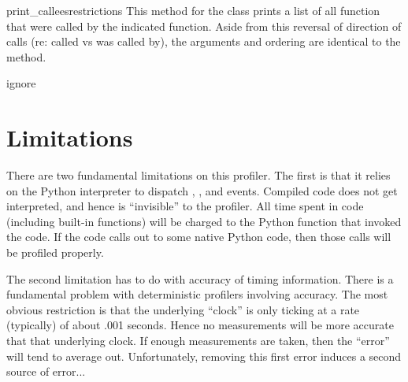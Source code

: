 \begin{methoddesc}[Stats]{print_callees}{restrictions}
This method for the  class prints a list of all function
that were called by the indicated function.  Aside from this reversal
of direction of calls (re: called vs was called by), the arguments and
ordering are identical to the  method.
\end{methoddesc}

\begin{methoddesc}[Stats]{ignore}{}
\end{methoddesc}


\section{Limitations \label{profile-limits}}

There are two fundamental limitations on this profiler.  The first is
that it relies on the Python interpreter to dispatch ,
, and  events.  Compiled \C{} code does not
get interpreted, and hence is ``invisible'' to the profiler.  All time
spent in \C{} code (including built-in functions) will be charged to the
Python function that invoked the \C{} code.  If the \C{} code calls out
to some native Python code, then those calls will be profiled
properly.

The second limitation has to do with accuracy of timing information.
There is a fundamental problem with deterministic profilers involving
accuracy.  The most obvious restriction is that the underlying ``clock''
is only ticking at a rate (typically) of about .001 seconds.  Hence no
measurements will be more accurate that that underlying clock.  If
enough measurements are taken, then the ``error'' will tend to average
out. Unfortunately, removing this first error induces a second source
of error...

